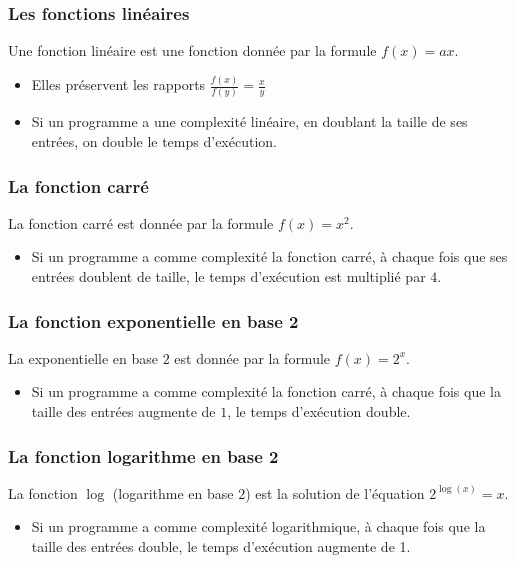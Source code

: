 \documentclass[aspectratio=169]{beamer}
\begin{document}
\begin{frame}
  \frametitle{Les fonctions linéaires}
    \begin{definition}
      Une fonction linéaire est une fonction donnée par la formule \(f(x) = ax\).
    \end{definition}
    \vspace{.5cm}

  \begin{itemize}
  \item Elles préservent les rapports \(\frac{f(x)}{f(y)} = \frac{x}{y}\)
  \item Si un programme a une complexité linéaire, en doublant la taille de ses
    entrées, on double le temps d'exécution.
  \end{itemize}
\end{frame}

\begin{frame}
  \frametitle{La fonction carré}
    \begin{definition}
      La fonction carré est donnée par la formule \(f(x) = x^{2}\).
    \end{definition}
    \vspace{.5cm}

  \begin{itemize}
  \item Si un programme a comme complexité la fonction carré, à chaque fois que
    ses entrées doublent de taille, le temps d'exécution est multiplié par
    \(4\).
  \end{itemize}
\end{frame}

\begin{frame}
  \frametitle{La fonction exponentielle en base 2}
    \begin{definition}
      La exponentielle en base \(2\) est donnée par la formule \(f(x) = 2^{x}\).
    \end{definition}
    \vspace{.5cm}

  \begin{itemize}
  \item Si un programme a comme complexité la fonction carré, à chaque fois que
    la taille des entrées augmente de \(1\), le temps d'exécution double.
  \end{itemize}

\end{frame}


\begin{frame}
  \frametitle{La fonction logarithme en base 2}
    \begin{definition}
      La fonction \(\log\) (logarithme en base \(2\)) est la solution de
      l'équation \(2^{\log(x)} = x\).
    \end{definition}
    \vspace{.5cm}

  \begin{itemize}
  \item Si un programme a comme complexité logarithmique, à chaque fois que la
    taille des entrées double, le temps d'exécution augmente de 1.
  \end{itemize}

\end{frame}
\end{document}
